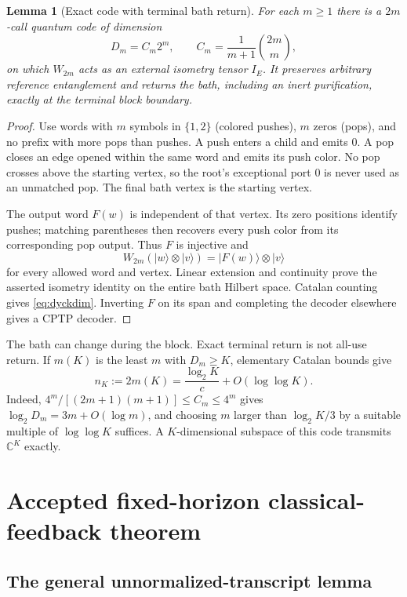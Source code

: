 \documentclass[11pt]{article}
\newtheorem{lemma}[theorem]{Lemma}
\newcommand{\ket}[1]{\lvert #1\rangle}
\begin{document}
\begin{lemma}[Exact code with terminal bath return]\label{lem:dyck}
For each $m\ge1$ there is a $2m$-call quantum code of dimension
\begin{equation}
 D_m=C_m2^m,\qquad C_m=\frac1{m+1}\binom{2m}{m},\label{eq:dyckdim}
\end{equation}
on which $W_{2m}$ acts as an external isometry tensor $I_E$. It preserves arbitrary reference entanglement and returns the bath, including an inert purification, exactly at the terminal block boundary.
\end{lemma}
\begin{proof}
Use words with $m$ symbols in $\{1,2\}$ (colored pushes), $m$ zeros (pops), and no prefix with more pops than pushes. A push enters a child and emits $0$. A pop closes an edge opened within the same word and emits its push color. No pop crosses above the starting vertex, so the root's exceptional port $0$ is never used as an unmatched pop. The final bath vertex is the starting vertex.

The output word $F(w)$ is independent of that vertex. Its zero positions identify pushes; matching parentheses then recovers every push color from its corresponding pop output. Thus $F$ is injective and
\[
 W_{2m}(\ket w\otimes\ket v)=\ket{F(w)}\otimes\ket v
\]
for every allowed word and vertex. Linear extension and continuity prove the asserted isometry identity on the entire bath Hilbert space. Catalan counting gives \eqref{eq:dyckdim}. Inverting $F$ on its span and completing the decoder elsewhere gives a CPTP decoder.
\end{proof}
The bath can change during the block. Exact terminal return is not all-use return. If $m(K)$ is the least $m$ with $D_m\ge K$, elementary Catalan bounds give
\begin{equation}
 n_K:=2m(K)=\frac{\log_2K}{c}+O(\log\log K).\label{eq:length}
\end{equation}
Indeed, $4^m/[(2m+1)(m+1)]\le C_m\le4^m$ gives $\log_2D_m=3m+O(\log m)$, and choosing $m$ larger than $\log_2K/3$ by a suitable multiple of $\log\log K$ suffices. A $K$-dimensional subspace of this code transmits $\mathbb C^K$ exactly.

\section{Accepted fixed-horizon classical-feedback theorem}\label{sec:feedback}

\subsection{The general unnormalized-transcript lemma}
\end{document}
